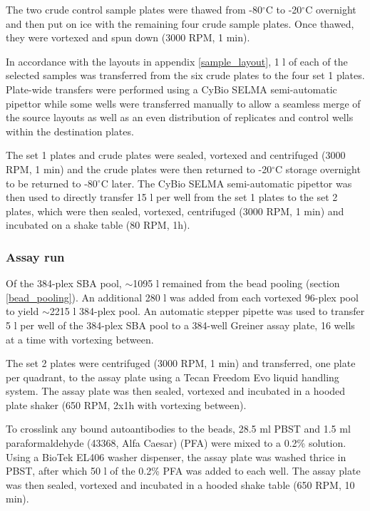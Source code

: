 \documentclass{article}
\begin{document}
The two crude control sample plates were thawed from -80$^{\circ}$C to -20$^{\circ}$C overnight and then put on ice with the remaining four crude sample plates. Once thawed, they were vortexed and spun down (3000 RPM, 1 min).

In accordance with the layouts in appendix \ref{sample_layout}, 1 \textmu l of each of the selected samples was transferred from the six crude plates to the four set 1 plates. Plate-wide transfers were performed using a CyBio SELMA semi-automatic pipettor while some wells were transferred manually to allow a seamless merge of the source layouts as well as an even distribution of replicates and control wells within the destination plates.

The set 1 plates and crude plates were sealed, vortexed and centrifuged (3000 RPM, 1 min) and the crude plates were then returned to -20$^{\circ}$C storage overnight to be returned to -80$^{\circ}$C later. The CyBio SELMA semi-automatic pipettor was then used to directly transfer 15 \textmu l per well from the set 1 plates to the set 2 plates, which were then sealed, vortexed, centrifuged (3000 RPM, 1 min) and incubated on a shake table (80 RPM, 1h).

\subsubsection{Assay run}
Of the 384-plex SBA pool, $\sim$1095 \textmu l remained from the bead pooling (section \ref{bead_pooling}). An additional 280 \textmu l was added from each vortexed 96-plex pool to yield $\sim$2215 \textmu l 384-plex pool. An automatic stepper pipette was used to transfer 5 \textmu l per well of the 384-plex SBA pool to a 384-well Greiner assay plate, 16 wells at a time with vortexing between.

The set 2 plates were centrifuged (3000 RPM, 1 min) and transferred, one plate per quadrant, to the assay plate using a Tecan Freedom Evo liquid handling system. The assay plate was then sealed, vortexed and incubated in a hooded plate shaker (650 RPM, 2x1h with vortexing between).

To crosslink any bound autoantibodies to the beads, 28.5 ml PBST and 1.5 ml paraformaldehyde (43368, Alfa Caesar) (PFA) were mixed to a 0.2\% solution. Using a BioTek EL406 washer dispenser, the assay plate was washed thrice in PBST, after which 50 \textmu l of the 0.2\% PFA was added to each well. The assay plate was then sealed, vortexed and incubated in a hooded shake table (650 RPM, 10 min).
\end{document}
